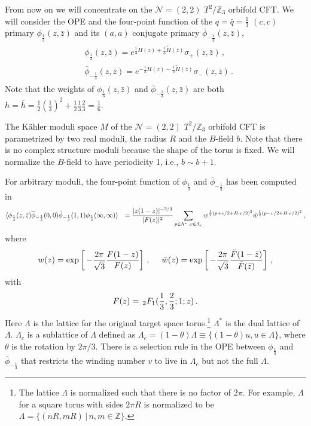 \documentclass[12pt]{article}
\begin{document}
From now on we will concentrate on the $\mathcal{N}=(2,2)$ $T^2/\mathbb{Z}_3$ orbifold CFT. We will consider the OPE and the four-point function of the $q=\bar q=\frac13$ $(c,c)$ primary $\phi_{\frac13}(z,\bar z)$ and its $(a,a)$ conjugate primary $\bar \phi_{-\frac13}(z,\bar z)$,
\begin{align}
\begin{split}
&\phi_{\frac13} (z,\bar z) =  e^{ \frac i3 H(z)  +  \frac i3 \tilde H(\bar z) } \sigma_+(z,\bar z)\,,\\
&\bar \phi_{-\frac13}(z,\bar z) =  e^{ - \frac i3 H(z)  -  \frac i3 \tilde H(\bar z) } \sigma_-(z,\bar z)\,.
\end{split}
\end{align}
Note that the weights of $\phi_{\frac13}(z,\bar z)$ and $\bar \phi_{-\frac13}(z,\bar z) $ are both $h = \bar h = \frac 12 (\frac 13)^2 + \frac 12 \frac 13 \frac 23= \frac16$. 



The K\"ahler moduli space $M$ of the $\mathcal{N}=(2,2)$ $T^2/\mathbb{Z}_3$ orbifold CFT is parametrized by two real moduli, the radius $R$ and the $B$-field $b$. Note that there is no  complex structure moduli because the shape of the torus is fixed.  We will normalize the $B$-field to have periodicity 1, i.e., $b\sim b+1$.

For arbitrary moduli, the four-point function of $\phi_{\frac13}$ and $\overline\phi_{-\frac13}$ has been computed in \cite{Dixon:1986qv,Chun:1989se}
\begin{align}\label{4ptT2Z3}
& \langle \phi_{\frac13} (z,\bar z) \overline\phi_{-\frac13} (0,0)\bar \phi_{-\frac13}(1,1)\phi_{\frac13} (\infty,\infty)\rangle
 &=  {| z(1-z)  |^{-2/3 } \over |F(z)|^2} \sum_{p\in \Lambda^* \,, v\in \Lambda_c} w^{{1\over2} (p+v/2+B\cdot v/2)^2}\bar w^{{1\over 2} (p-v/2+B\cdot v/2)^2}\,,
\end{align}
where 
\begin{align}
w(z) =  \exp\left[\,-  { 2 \pi \over \sqrt{3}}  {F(1-z)\over F(z) } \right]\,,~~~~
\bar w(z) =  \exp\left[\,-  { 2 \pi \over \sqrt{3}}  {\bar F(1- \bar z)\over \bar F(\bar z) } \right]\,,
\end{align}
with
\begin{align}
F(z) = \,_2F_1({1\over 3}  ,\frac23 ;1;z)\,.
\end{align}
Here $\Lambda$ is the lattice for the original target space torus.\footnote{The lattice $\Lambda$ is normalized such that there is no factor of $2\pi$. For example,  $\Lambda$ for a square torus with sides $2\pi R$ is normalized to be $\Lambda = \{ ( nR, m R) \,|\, n,m\in \mathbb{Z}\}$.} $\Lambda^*$ is the dual lattice of $\Lambda$. $\Lambda_c $ is a sublattice of $\Lambda$ defined as $\Lambda_c = (1-\theta) \Lambda \equiv \{ (1-\theta)u, u\in \Lambda\}$, where $\theta$ is the rotation by $2\pi /3$.  There is a selection rule in the OPE between $\phi_{\frac13}$ and $\overline\phi_{-\frac13}$ that restricts the winding number $v$ to live in $\Lambda_c$ but not the full $\Lambda$.
\end{document}
